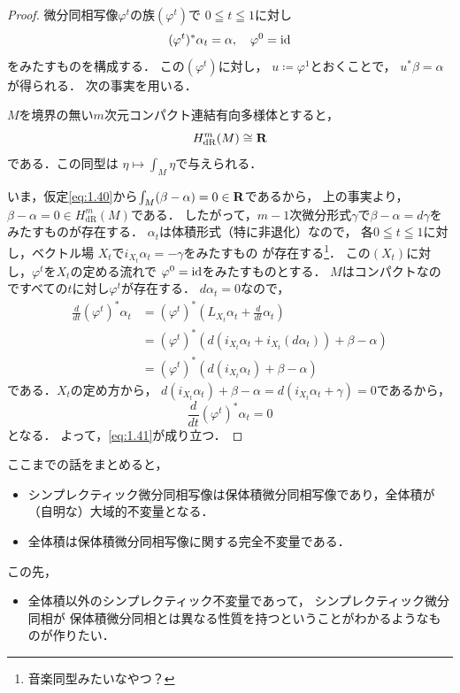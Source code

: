 \begin{proof}
    微分同相写像\(\varphi^{t}\)の族\((\varphi^t)\)で
    \(0\leqq t\leqq 1\)に対し\begin{equation}
        (\varphi^t)^{\ast}\alpha_{t}=\alpha,
        \quad
        \varphi^0=\mathop{\mathrm{id}}\nolimits\label{eq:1.41}
    \end{equation}をみたすものを構成する．
    この\((\varphi^t)\)に対し，
    \(u\coloneqq \varphi^1\)とおくことで，
    \(u^{\ast}\beta=\alpha\)が得られる．
    次の事実を用いる．
    \begin{FACT*}
        \(M\)を境界の無い\(m\)次元コンパクト連結有向多様体とすると，
        \[H^{m}_{\mathrm{dR}}(M)\cong\mathbf{R}\]である．この同型は
        \(\eta\mapsto\int_{M}^{}\eta\)で与えられる．
    \end{FACT*}
    いま，仮定\eqref{eq:1.40}から\(
        \int_{M}^{}(\beta-\alpha)=0\in\mathbf{R}
    \)であるから，
    上の事実より，\(
        \beta-\alpha=0\in H^{m}_{\mathrm{dR}}(M)
    \)である．
    したがって，\(m-1\)次微分形式\(\gamma\)で\(
        \beta-\alpha=d\gamma
    \)をみたすものが存在する．
    \(\alpha_t\)は体積形式（特に非退化）なので，
    各\(0\leqq t\leqq 1\)に対し，ベクトル場
    \(X_t\)で\(i_{X_{t}}\alpha_t=-\gamma\)をみたすもの
    が存在する\footnote{音楽同型みたいなやつ？}．
    この\((X_t)\)に対し，\(\varphi^t\)を\(X_t\)の定める流れで
    \(\varphi^0=\mathop{\mathrm{id}}\nolimits\)をみたすものとする．
    \(M\)はコンパクトなのですべての\(t\)に対し\(\varphi^t\)が存在する．
    \(d\alpha_t=0\)なので，
    \begin{align*}
        \frac{d}{dt}(\varphi^{t})^{\ast}\alpha_t
        &=(\varphi^{t})^{\ast}(L_{X_t}\alpha_t+\frac{d}{dt}\alpha_t)\\
        &=(\varphi^{t})^{\ast}(d(i_{X_t}\alpha_t+i_{X_t}(d\alpha_t))+\beta-\alpha)\\
        &=(\varphi^{t})^{\ast}(d(i_{X_t}\alpha_t)+\beta-\alpha)
    \end{align*}
    である．\(X_t\)の定め方から，
    \(
        d(i_{X_t}\alpha_t)+\beta-\alpha
        =
        d(i_{X_t}\alpha_t+\gamma)=0
    \)であるから，
    \[
        \frac{d}{dt}(\varphi^{t})^{\ast}\alpha_t=0
    \]となる．
    よって，\eqref{eq:1.41}が成り立つ．
\end{proof}

ここまでの話をまとめると，
\begin{itemize}
    \item シンプレクティック微分同相写像は保体積微分同相写像であり，全体積が（自明な）大域的不変量となる．
    \item 全体積は保体積微分同相写像に関する完全不変量である．
\end{itemize}
この先，
\begin{itemize}
    \item 全体積以外のシンプレクティック不変量であって，
    シンプレクティック微分同相が
    保体積微分同相とは異なる性質を持つということがわかるようなものが作りたい．
\end{itemize}
